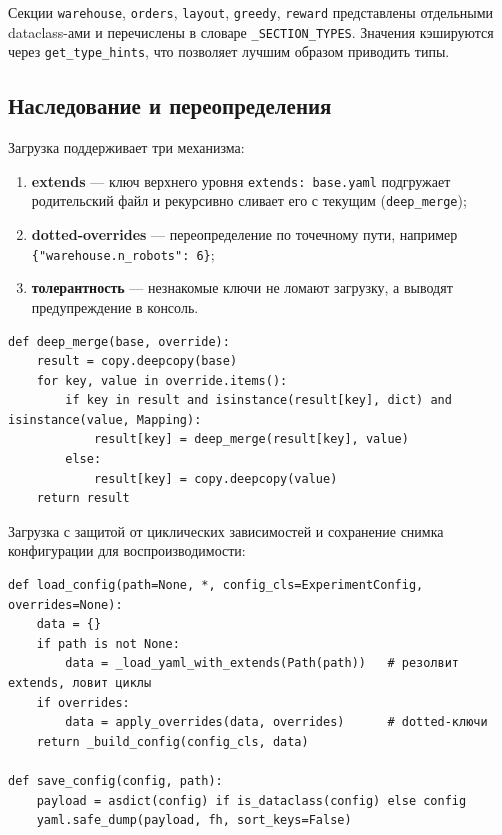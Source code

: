 \documentclass[11pt,a4paper]{article}
\newcommand{\code}[1]{\texttt{#1}}
\begin{document}
Секции \code{warehouse}, \code{orders}, \code{layout}, \code{greedy},
\code{reward} представлены отдельными dataclass-ами и перечислены в словаре
\code{\_SECTION\_TYPES}. Значения кэшируются через \code{get\_type\_hints}, что
позволяет лучшим образом приводить типы.

\subsection{Наследование и переопределения}
Загрузка поддерживает три механизма:
\begin{enumerate}[nosep]
\item \textbf{extends} — ключ верхнего уровня \code{extends: base.yaml}
подгружает родительский файл и рекурсивно сливает его с текущим
(\code{deep\_merge});
\item \textbf{dotted-overrides} — переопределение по точечному пути, например
\code{\{"warehouse.n\_robots": 6\}};
\item \textbf{толерантность} — незнакомые ключи не ломают загрузку, а выводят
предупреждение в консоль.
\end{enumerate}

\begin{lstlisting}[style=py]
def deep_merge(base, override):
    result = copy.deepcopy(base)
    for key, value in override.items():
        if key in result and isinstance(result[key], dict) and isinstance(value, Mapping):
            result[key] = deep_merge(result[key], value)
        else:
            result[key] = copy.deepcopy(value)
    return result
\end{lstlisting}

Загрузка с защитой от циклических зависимостей и сохранение снимка конфигурации
для воспроизводимости:

\begin{lstlisting}[style=py]
def load_config(path=None, *, config_cls=ExperimentConfig, overrides=None):
    data = {}
    if path is not None:
        data = _load_yaml_with_extends(Path(path))   # резолвит extends, ловит циклы
    if overrides:
        data = apply_overrides(data, overrides)      # dotted-ключи
    return _build_config(config_cls, data)

def save_config(config, path):
    payload = asdict(config) if is_dataclass(config) else config
    yaml.safe_dump(payload, fh, sort_keys=False)
\end{lstlisting}

\end{document}
